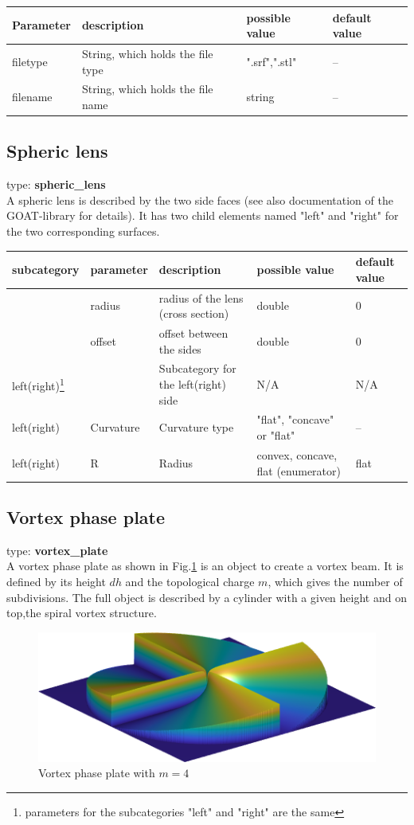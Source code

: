 \documentclass[a4paper,html,11pt,openany]{book}
\begin{document}
 
\vspace{1em} 
\begin{tabular}{p{2cm}|m{3.5cm}|m{3.0cm}|p{1.7cm}}
 Parameter  & description  & possible value & default value\\
 \hline
 filetype & String, which holds the file type & ".srf",".stl" & -- \\
 filename & String, which holds the file name & string & -- \\
 \end{tabular}
 
\subsection{Spheric lens}
type: \textbf{spheric\_lens} \\
A spheric lens is described by the two side faces (see also documentation of the GOAT-library for details). It has two child elements named "left" and "right" for the two corresponding surfaces. 

 
\vspace{1em} 
\begin{tabular}{p{2cm}|m{2cm}|m{2.5cm}|m{2.0cm}|p{1.7cm}}
 subcategory  & parameter & description  & possible value & default value\\
 \hline
 & radius  & radius of the lens (cross section) & double & 0 \\
 \hline
 & offset & offset between the sides & double & 0 \\
 \hline
 left(right)\footnote{parameters for the subcategories "left" and "right" are the same} & & Subcategory for the left(right) side & N/A & N/A  \\
 \hline
  left(right) & Curvature & Curvature type & "flat", "concave" or "flat" & --  \\
    left(right) & R & Radius  & convex, concave, flat (enumerator)  & flat  \\
 \end{tabular}
 
\subsection{Vortex phase plate}
type: \textbf{vortex\_plate} \\
A vortex phase plate as shown in Fig.\ref{fig:vortexplate} is an object to create a vortex beam. It is defined by its height $dh$ and the topological charge $m$, which gives the number of subdivisions. The full object is described by a cylinder with a given height and on top,the spiral vortex structure.   
\begin{figure}[h!]
   \includegraphics{vortex_plate.png}
   \caption{Vortex phase plate with $m=4$}
   \label{fig:vortexplate}
\end{figure} 
\end{document}
